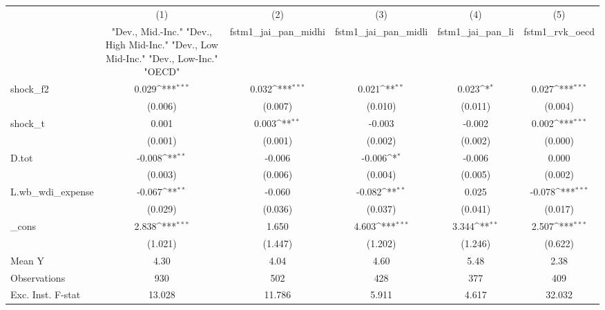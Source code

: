 {
\def\sym#1{\ifmmode^{#1}\else\(^{#1}\)\fi}
\begin{tabular}{l*{5}{c}}
\toprule
            &\multicolumn{1}{c}{(1)}&\multicolumn{1}{c}{(2)}&\multicolumn{1}{c}{(3)}&\multicolumn{1}{c}{(4)}&\multicolumn{1}{c}{(5)}\\
            &\multicolumn{1}{c}{ "Dev., Mid.-Inc." "Dev., High Mid-Inc." "Dev., Low Mid-Inc." "Dev., Low-Inc." "OECD" }&\multicolumn{1}{c}{fstm1\_jai\_pan\_midhi}&\multicolumn{1}{c}{fstm1\_jai\_pan\_midli}&\multicolumn{1}{c}{fstm1\_jai\_pan\_li}&\multicolumn{1}{c}{fstm1\_rvk\_oecd}\\
\midrule
shock\_f2    &       0.029\sym{***}&       0.032\sym{***}&       0.021\sym{**} &       0.023\sym{*}  &       0.027\sym{***}\\
            &     (0.006)         &     (0.007)         &     (0.010)         &     (0.011)         &     (0.004)         \\
\addlinespace
shock\_t     &       0.001         &       0.003\sym{**} &      -0.003         &      -0.002         &       0.002\sym{***}\\
            &     (0.001)         &     (0.001)         &     (0.002)         &     (0.002)         &     (0.000)         \\
\addlinespace
D.tot       &      -0.008\sym{**} &      -0.006         &      -0.006\sym{*}  &      -0.006         &       0.000         \\
            &     (0.003)         &     (0.006)         &     (0.004)         &     (0.005)         &     (0.002)         \\
\addlinespace
L.wb\_wdi\_expense&      -0.067\sym{**} &      -0.060         &      -0.082\sym{**} &       0.025         &      -0.078\sym{***}\\
            &     (0.029)         &     (0.036)         &     (0.037)         &     (0.041)         &     (0.017)         \\
\addlinespace
\_cons      &       2.838\sym{***}&       1.650         &       4.603\sym{***}&       3.344\sym{**} &       2.507\sym{***}\\
            &     (1.021)         &     (1.447)         &     (1.202)         &     (1.246)         &     (0.622)         \\
\midrule
Mean Y      &        4.30         &        4.04         &        4.60         &        5.48         &        2.38         \\
Observations&         930         &         502         &         428         &         377         &         409         \\
Exc. Inst. F-stat&      13.028         &      11.786         &       5.911         &       4.617         &      32.032         \\
\bottomrule
\end{tabular}
}

